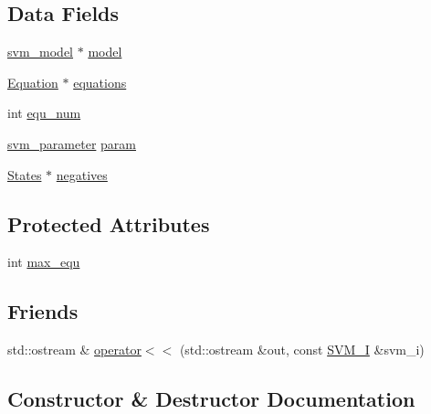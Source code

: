 \subsection*{Data Fields}
\begin{DoxyCompactItemize}
\item 
\hyperlink{structsvm__model}{svm\+\_\+model} $\ast$ \hyperlink{classSVM__I_a7b7466c2246c73438ead77631278ff3a}{model}
\item 
\hyperlink{classEquation}{Equation} $\ast$ \hyperlink{classSVM__I_af905b6378094007502fa5d81f018a11b}{equations}
\item 
int \hyperlink{classSVM__I_ab674468eec42010761332da3f9b2f69c}{equ\+\_\+num}
\item 
\hyperlink{structsvm__parameter}{svm\+\_\+parameter} \hyperlink{classSVM__I_afbec56807dada05e9e527587d25acfb6}{param}
\item 
\hyperlink{classStates}{States} $\ast$ \hyperlink{classSVM__I_a8a56898f346ff15c5bb904ff6e001dad}{negatives}
\end{DoxyCompactItemize}
\subsection*{Protected Attributes}
\begin{DoxyCompactItemize}
\item 
int \hyperlink{classSVM__I_aaa890d6eaac46a447820a368f056eea7}{max\+\_\+equ}
\end{DoxyCompactItemize}
\subsection*{Friends}
\begin{DoxyCompactItemize}
\item 
std\+::ostream \& \hyperlink{classSVM__I_ac0ce6164082022082361d78ba7b1c245}{operator$<$$<$} (std\+::ostream \&out, const \hyperlink{classSVM__I}{S\+V\+M\+\_\+I} \&svm\+\_\+i)
\end{DoxyCompactItemize}


\subsection{Constructor \& Destructor Documentation}
